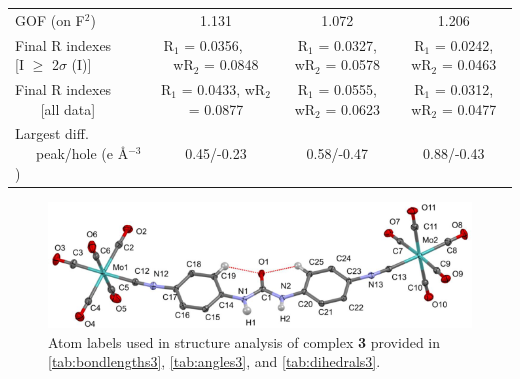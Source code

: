 \begin{table}[]
\begin{tabular}{lccc}
GOF (on F$^{2}$) & 1.131 & 1.072 & 1.206 \\
\makecell[l]{\rule{0pt}{2ex}Final R indexes \\ ~~~ [I $\geq$ 2$\sigma$ (I)]} & \makecell{\rule{0pt}{2ex}R$_{1}$ = 0.0356, \\ ~~~ wR$_{2}$ = 0.0848} & \makecell{R$_{1}$ = 0.0327, \\ wR$_{2}$ = 0.0578} & \makecell{R$_{1}$ = 0.0242, \\ wR$_{2}$ = 0.0463} \\
\makecell[l]{\rule{0pt}{2ex}Final R indexes \\ ~~~ [all data]} & \makecell{R$_{1}$ = 0.0433, \\ wR$_{2}$ = 0.0877} & \makecell{R$_{1}$ = 0.0555, \\ wR$_{2}$ = 0.0623} & \makecell{R$_{1}$ = 0.0312, \\ wR$_{2}$ = 0.0477} \\
\makecell[l]{\rule{0pt}{2ex}Largest diff. \\ ~~~peak/hole (e \AA$^{-3}$)} & 0.45/-0.23 & 0.58/-0.47 & 0.88/-0.43
\end{tabular}
\end{table}


\begin{figure}
    \centering
    \includegraphics[width=0.8\linewidth]{figures/pub2/si_fig4.png}
    \caption{Atom labels used in structure analysis of complex \textbf{3} provided in \autoref{tab:bondlengths3}, \autoref{tab:angles3}, and \autoref{tab:dihedrals3}.}\label{fig:complex3-labels}
\end{figure}


